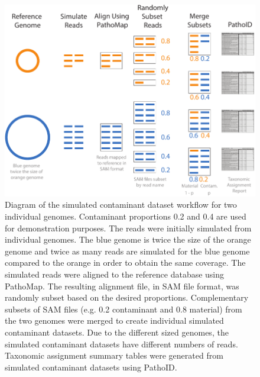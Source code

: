 \documentclass[fleqn,10pt,lineno]{wlpeerj}\usepackage[]{graphicx}\usepackage[]{color}
\makeatletter
\def\maxwidth{ %
  \ifdim\Gin@nat@width>\linewidth
    \linewidth
  \else
    \Gin@nat@width
  \fi
}
\newenvironment{knitrout}{}{} %
\makeatother
\begin{document}
\begin{knitrout}
\color{fgcolor}\begin{figure}
\includegraphics[width=\maxwidth]{figure/contam_simulation} \caption[Diagram of the simulated contaminant dataset workflow for two individual genomes]{Diagram of the simulated contaminant dataset workflow for two individual genomes. Contaminant proportions 0.2 and 0.4 are used for demonstration purposes. The reads were initially simulated from individual genomes. The blue genome is twice the size of the orange genome and twice as many reads are simulated for the blue genome compared to the orange in order to obtain the same coverage. The simulated reads were aligned to the reference database using PathoMap. The resulting alignment file, in SAM file format, was randomly subset based on the desired proportions. Complementary subsets of SAM files (e.g. 0.2 contaminant and 0.8 material) from the two genomes were merged to create individual simulated contaminant datasets.  Due to the different sized genomes, the simulated contaminant datasets have different numbers of reads. Taxonomic assignment summary tables were generated from simulated contaminant datasets using PathoID.}\label{fig:contam_simulation}
\end{figure}


\end{knitrout}
\end{document}
